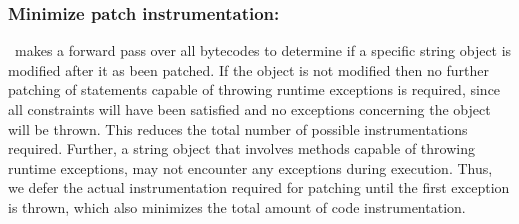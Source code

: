 \subsubsection{Minimize patch instrumentation: }
\label{subsubsec:minimizePatchInstrumentation}
% 
\tool\ makes a forward pass over all bytecodes to determine if a specific string
object is modified after it as been patched. If the object is not modified then
no further patching of statements capable of throwing runtime exceptions is
required, since all constraints will have been satisfied and no exceptions
concerning the object will be thrown. This reduces the total number of possible
instrumentations required. Further, a string object that involves methods
capable of throwing runtime exceptions, may not encounter any exceptions during
execution. Thus, we defer the actual instrumentation required for patching until
the first exception is thrown, which also minimizes the total amount of code
instrumentation.